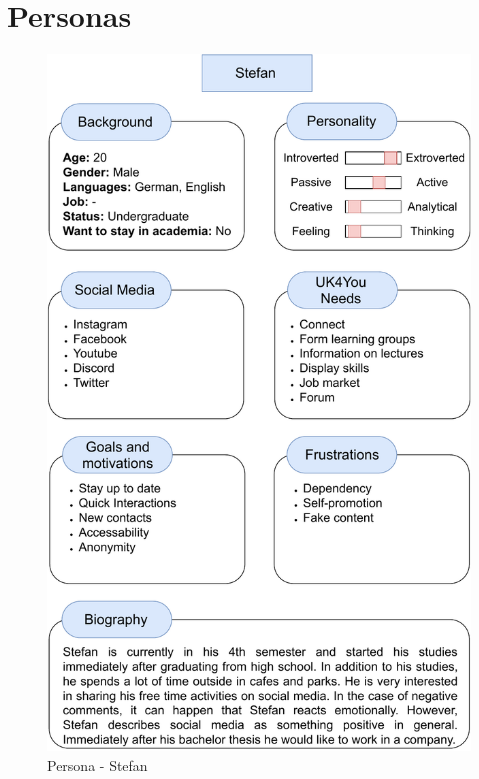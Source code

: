 \section{Personas}

\begin{figure}[ht]
    \centering
    \includegraphics[width=0.8\columnwidth]{figures/Persona1.pdf}
    \caption{\label{fig:persona-one} Persona - Stefan}
\end{figure}

